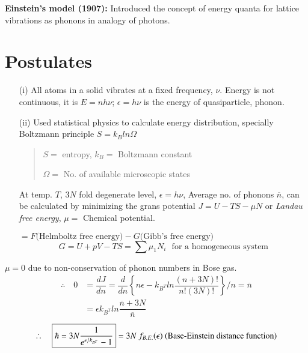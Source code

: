 \noindent
{\bf Einstein's model (1907):} Introduced the concept of energy quanta for lattice vibrations as phonons in analogy of photons.

\section*{Postulates}
\begin{itemize}
\item[(i)] All atoms in a solid vibrates at a fixed frequency, $\nu$. Energy is not continuous, it is $E=nh\nu$; $\epsilon=h\nu$ is the energy of quasiparticle, phonon.

\item[(ii)] Used statistical physics to calculate energy distribution, specially Boltzmann principle $S=k_{B}ln\Omega$
\begin{quote}
$S=$ entropy, $k_{B}=$ Boltzmann constant

$\Omega=$ No. of available microscopic states
\end{quote}
At temp. $T$, $3N$ fold degenerate level, $\epsilon=h\nu$, Average no. of phonons $\overline{n}$, can be calculated by minimizing the grans potential $J=U-TS-\mu N$ or {\em Landau free energy}, $\mu=$ Chemical potential.

$=F \text{(Helmboltz free energy)} -G \text{(Gibb's free energy)}$ 
$$
G=U+pV-TS=\sum\mu_{1}N_{i}\text{~ for a homogeneous system}
$$
\end{itemize}

$\mu=0$ due to non-conservation of phonon numbers in Bose gas.
\begin{align*}
\therefore\quad 0 &=\dfrac{dJ}{dn}=\dfrac{d}{dn}\left\{n\epsilon-k_{B^{T}}ln \dfrac{(n+3N)!}{n!(3N)!}\right\}/n=\overline{n}\\
&= \epsilon  k_{B^{T}}ln \dfrac{\overline{n}+3N}{\overline{n}}
\end{align*}
$$
\therefore\quad \fbox{$\hbar = 3N \dfrac{1}{e^{\epsilon/k_{B^{T}}}-1}$}=3N \ f_{B.E.}(\epsilon) \text{ (Base-Einstein distance function)}
$$


